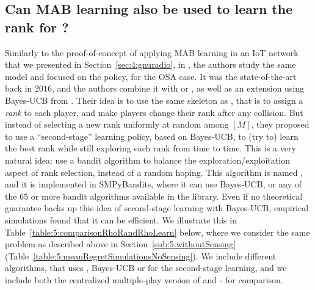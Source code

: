 \subsection{Can MAB learning also be used to learn the rank for \RhoRand{} ?}
\label{sub:5:USRPdemos}

Similarly to the proof-of-concept of applying MAB learning in an IoT network that we presented in Section~\ref{sec:4:gnuradio},
%
%
in \cite{darak2016bayesian,Darak16}, the authors study the same model and focused on the \RhoRand{} policy, for the OSA case.
It was the state-of-the-art back in $2016$, and the authors combine it with \UCB{} or \klUCB, as well as an extension using Bayes-UCB from \cite{Kaufmann12BUCB}.
%
Their idea is to use the same skeleton as \RhoRand, that is to assign a \emph{rank} to each player, and make players change their rank after any collision. But instead of selecting a new rank uniformly at random among $[M]$, they proposed to use a ``second-stage'' learning policy, based on Bayes-UCB, to (try to) learn the best rank while still exploring each rank from time to time.
This is a very natural idea: use a bandit algorithm to balance the exploration/exploitation aspect of rank selection, instead of a random hoping.
This algorithm is named \rhoLearn, and it is implemented in SMPyBandits,
where it can use Bayes-UCB, or any of the $65$ or more bandit algorithms available in the library.
%
Even if no theoretical guarantee backs up this idea of second-stage learning with Bayes-UCB, empirical simulations found that it can be efficient.
We illustrate this in Table~\ref{table:5:comparisonRhoRandRhoLearn} below, where we consider the same problem as described above in Section~\ref{sub:5:withoutSensing} (Table~\ref{table:5:meanRegretSimulationsNoSensing}).
We include different \rhoLearn{} algorithms, that uses \klUCB{}, Bayes-UCB or \ExpThree{} for the second-stage learning,
and we include both the centralized multiple-play version of \klUCB{} and \MCTopM-\klUCB{} for comparison.

